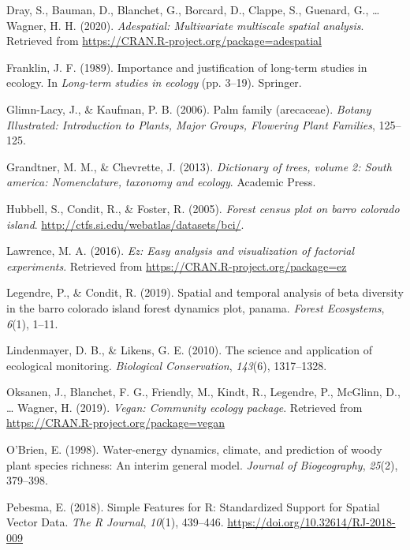 \documentclass[11pt,]{article}
\begin{document}
\hypertarget{ref-adespatial}{}
Dray, S., Bauman, D., Blanchet, G., Borcard, D., Clappe, S., Guenard,
G., \ldots{} Wagner, H. H. (2020). \emph{Adespatial: Multivariate
multiscale spatial analysis}. Retrieved from
\url{https://CRAN.R-project.org/package=adespatial}

\hypertarget{ref-franklin1989importance}{}
Franklin, J. F. (1989). Importance and justification of long-term
studies in ecology. In \emph{Long-term studies in ecology} (pp. 3--19).
Springer.

\hypertarget{ref-glimn2006palm}{}
Glimn-Lacy, J., \& Kaufman, P. B. (2006). Palm family (arecaceae).
\emph{Botany Illustrated: Introduction to Plants, Major Groups,
Flowering Plant Families}, 125--125.

\hypertarget{ref-grandtner2013dictionary}{}
Grandtner, M. M., \& Chevrette, J. (2013). \emph{Dictionary of trees,
volume 2: South america: Nomenclature, taxonomy and ecology}. Academic
Press.

\hypertarget{ref-Hubbell2005Barro}{}
Hubbell, S., Condit, R., \& Foster, R. (2005). \emph{Forest census plot
on barro colorado island}.
\url{http://ctfs.si.edu/webatlas/datasets/bci/}.

\hypertarget{ref-EZ}{}
Lawrence, M. A. (2016). \emph{Ez: Easy analysis and visualization of
factorial experiments}. Retrieved from
\url{https://CRAN.R-project.org/package=ez}

\hypertarget{ref-legendre2019spatial}{}
Legendre, P., \& Condit, R. (2019). Spatial and temporal analysis of
beta diversity in the barro colorado island forest dynamics plot,
panama. \emph{Forest Ecosystems}, \emph{6}(1), 1--11.

\hypertarget{ref-lindenmayer2010science}{}
Lindenmayer, D. B., \& Likens, G. E. (2010). The science and application
of ecological monitoring. \emph{Biological Conservation}, \emph{143}(6),
1317--1328.

\hypertarget{ref-VeganPack}{}
Oksanen, J., Blanchet, F. G., Friendly, M., Kindt, R., Legendre, P.,
McGlinn, D., \ldots{} Wagner, H. (2019). \emph{Vegan: Community ecology
package}. Retrieved from \url{https://CRAN.R-project.org/package=vegan}

\hypertarget{ref-o1998water}{}
O'Brien, E. (1998). Water-energy dynamics, climate, and prediction of
woody plant species richness: An interim general model. \emph{Journal of
Biogeography}, \emph{25}(2), 379--398.

\hypertarget{ref-sfpackage}{}
Pebesma, E. (2018). Simple Features for R: Standardized Support for
Spatial Vector Data. \emph{The R Journal}, \emph{10}(1), 439--446.
\url{https://doi.org/10.32614/RJ-2018-009}
\end{document}
